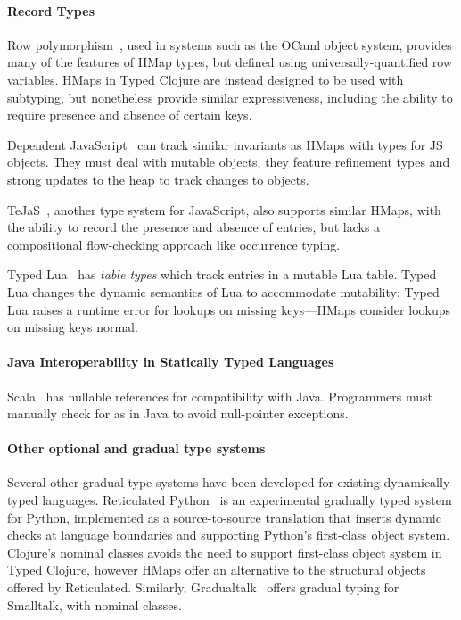 \documentclass[9pt]{extarticle}
\begin{document}
\paragraph{Record Types} Row polymorphism~\cite{Wand89typeinference,CM91,HP91}, used
in systems such as the OCaml object system, provides many of the
features of HMap types, but defined using universally-quantified row
variables. HMaps in Typed Clojure are instead designed to be used with
subtyping, but nonetheless provide similar expressiveness, including
the ability to require presence and absence of certain keys. 

Dependent JavaScript~\cite{Chugh:2012:DTJ} can track similar
invariants as HMaps with types for JS objects. They must deal with
mutable objects, they feature refinement types and strong updates to
the heap to track changes to objects.

TeJaS~\cite{TeJaS}, another type system for JavaScript,
also supports similar HMaps, with the ability to
record the presence and absence of entries, but lacks a compositional
flow-checking approach like occurrence typing.

Typed Lua~\cite{Maidl:2014:TLO} has \emph{table types} which track
entries in a mutable Lua table.  Typed Lua changes the dynamic
semantics of Lua to accommodate mutability: Typed Lua raises a runtime
error for lookups on missing keys---HMaps consider lookups on missing
keys normal.

\paragraph{Java Interoperability in Statically Typed Languages}
Scala~\cite{OCD+} has nullable references for compatibility with Java.
Programmers must manually check for
 as in Java to avoid null-pointer exceptions. 


\paragraph{Other optional and gradual type systems}
Several other gradual type
systems have been developed for existing
dynamically-typed languages.  Reticulated Python~\cite{Vitousek14} is
an experimental gradually typed system for Python, implemented as a
source-to-source translation that inserts dynamic checks at language
boundaries and supporting Python's first-class object system. 
Clojure's nominal classes avoids the need to support
first-class object system in Typed Clojure, however HMaps offer an alternative to
the structural objects offered by Reticulated. Similarly,
Gradualtalk~\cite{gradualtalk} offers gradual typing for Smalltalk,
with nominal classes.
\end{document}
